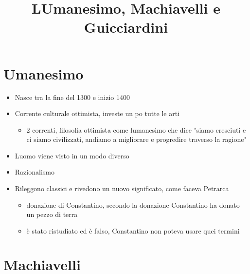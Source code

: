 \documentclass[
]{article}
\title{L\textquotesingle Umanesimo, Machiavelli e Guicciardini}
\author{}
\date{}
\providecommand{\tightlist}{%
  \setlength{\itemsep}{0pt}\setlength{\parskip}{0pt}}
\begin{document}
\maketitle

\hypertarget{umanesimo}{%
\section{Umanesimo}\label{umanesimo}}

\begin{itemize}
\tightlist
\item
  Nasce tra la fine del 1300 e inizio 1400
\item
  Corrente culturale ottimista, investe un po\textquotesingle{} tutte le
  arti

  \begin{itemize}
  \tightlist
  \item
    2 correnti, filosofia ottimista come l\textquotesingle umanesimo che
    dice "siamo cresciuti e ci siamo civilizzati, andiamo a migliorare e
    progredire traverso la ragione"
  \end{itemize}
\item
  L\textquotesingle uomo viene visto in un modo diverso
\item
  Razionalismo
\item
  Rileggono classici e rivedono un nuovo significato, come faceva
  Petrarca

  \begin{itemize}
  \tightlist
  \item
    donazione di Constantino, secondo la donazione Constantino ha donato
    un pezzo di terra
  \item
    è stato ristudiato ed è falso, Constantino non poteva usare quei
    termini
  \end{itemize}
\end{itemize}

\hypertarget{machiavelli}{%
\section{Machiavelli}\label{machiavelli}}
\end{document}
